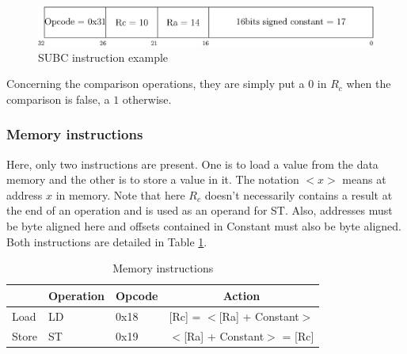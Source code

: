 \begin{figure}[H]
    \centering
    \includegraphics[scale=0.6]{Chapter3-CPU/res/instruction_subc}
    \caption{SUBC instruction example}
    \label{fig:instructions/subc}
\end{figure}

Concerning the comparison operations, they are simply put a $0$ in $R_c$ when the comparison is 
false, a $1$ otherwise.

\subsubsection*{Memory instructions}

Here, only two instructions are present. One is to load a value from the data memory and the other 
is to store a value in it. The notation $<x>$ means at address $x$ in memory. Note that here $R_c$
doesn't necessarily contains a result at the end of an operation and is used as an operand for ST.
Also, addresses must be byte aligned here and offsets contained in Constant must also be byte
aligned. Both instructions are detailed in Table \ref{tab:instruction/dm}.

\begin{table}[H]
    \centering
    \begin{tabular}{|l|l|l|l|}
    \hline
    \rowcolor[HTML]{DAE8FC} 
    \multicolumn{1}{|c|}{\cellcolor[HTML]{DAE8FC}\textbf{Name}} & \multicolumn{1}{c|}{\cellcolor[HTML]{DAE8FC}\textbf{Operation}} & \multicolumn{1}{c|}{\cellcolor[HTML]{DAE8FC}\textbf{Opcode}} & \multicolumn{1}{c|}{\cellcolor[HTML]{DAE8FC}\textbf{Action}} \\ \hline
    Load                                                        & LD                                                              & 0x18                                                         & {[}Rc{]} = $<${[}Ra{]} + Constant$>$      \\ \hline
    Store                                                       & ST                                                              & 0x19                                                         & $<${[}Ra{]} + Constant$>$ = {[}Rc{]}        \\ \hline
    \end{tabular}
    \caption{Memory instructions}
    \label{tab:instruction/dm}
\end{table}


